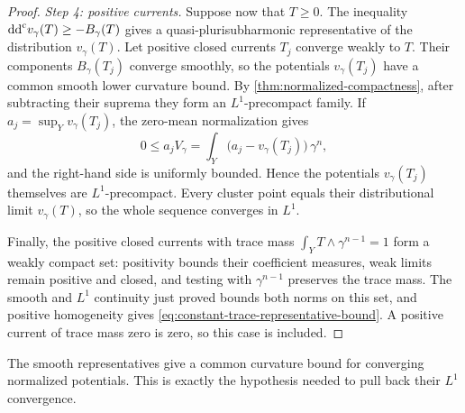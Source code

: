 \begin{proof}
\emph{Step 4: positive currents.} Suppose now that $T\geq0$. The inequality $\mathrm{dd}^{\mathrm{c}} v_\gamma(T)\geq-B_\gamma(T)$ gives a quasi-plurisubharmonic representative of the distribution $v_\gamma(T)$. Let positive closed currents $T_j$ converge weakly to $T$. Their components $B_\gamma(T_j)$ converge smoothly, so the potentials $v_\gamma(T_j)$ have a common smooth lower curvature bound. By \cref{thm:normalized-compactness}, after subtracting their suprema they form an $L^1$-precompact family. If $a_j=\sup_Yv_\gamma(T_j)$, the zero-mean normalization gives
\[
 0\leq a_j V_\gamma=\int_Y\bigl(a_j-v_\gamma(T_j)\bigr)\,\gamma^n,
\]
and the right-hand side is uniformly bounded. Hence the potentials $v_\gamma(T_j)$ themselves are $L^1$-precompact. Every cluster point equals their distributional limit $v_\gamma(T)$, so the whole sequence converges in $L^1$.

Finally, the positive closed currents with trace mass $\int_YT\wedge\gamma^{n-1}=1$ form a weakly compact set: positivity bounds their coefficient measures, weak limits remain positive and closed, and testing with $\gamma^{n-1}$ preserves the trace mass. The smooth and $L^1$ continuity just proved bounds both norms on this set, and positive homogeneity gives \eqref{eq:constant-trace-representative-bound}. A positive current of trace mass zero is zero, so this case is included.
\end{proof}

The smooth representatives give a common curvature bound for converging normalized potentials. This is exactly the hypothesis needed to pull back their $L^1$ convergence.

